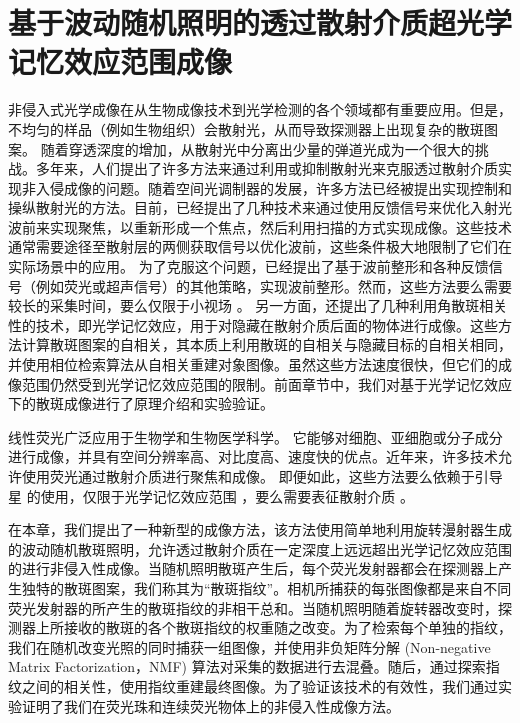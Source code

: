 
\chapter{基于波动随机照明的透过散射介质超光学记忆效应范围成像}

非侵入式光学成像在从生物成像技术\cite{zhao_non-invasive_2001,artzi_vivo_2011}到光学检测\cite{kozloff_non-invasive_2009}的各个领域都有重要应用。但是，不均匀的样品（例如生物组织）会散射光，从而导致探测器上出现复杂的散斑图案\cite{Goodman1976,Bender}。
随着穿透深度的增加，从散射光中分离出少量的弹道光成为一个很大的挑战\cite{Abramson1978,huang_optical_1991}。多年来，人们提出了许多方法来通过利用或抑制散射光来克服透过散射介质实现非入侵成像的问题。随着空间光调制器的发展，许多方法已经被提出实现控制和操纵散射光的方法\cite{Mosk2012,rotter_light_2017}。目前，已经提出了几种技术来通过使用反馈信号来优化入射光波前来实现聚焦，以重新形成一个焦点，然后利用扫描的方式实现成像\cite{Vellekoop2007,Horstmeyer2015}。这些技术通常需要途径至散射层的两侧获取信号以优化波前，这些条件极大地限制了它们在实际场景中的应用。
为了克服这个问题，已经提出了基于波前整形和各种反馈信号（例如荧光或超声信号）的其他策略\cite{Horstmeyer2015,Katz2019,Popoff2010,Hofer2019}，实现波前整形。然而，这些方法要么需要较长的采集时间，要么仅限于小视场 。
另一方面，还提出了几种利用角散斑相关性的技术\cite{bertolotti_non-invasive_2012,katz_non-invasive_2014}，即光学记忆效应\cite{Freund1988,Yllmaz2019,Osnabrugge}，用于对隐藏在散射介质后面的物体进行成像。这些方法计算散斑图案的自相关，其本质上利用散斑的自相关与隐藏目标的自相关相同，并使用相位检索算法从自相关重建对象图像。虽然这些方法速度很快，但它们的成像范围仍然受到光学记忆效应范围的限制。前面章节中，我们对基于光学记忆效应下的散斑成像进行了原理介绍和实验验证。

线性荧光广泛应用于生物学和生物医学科学\cite{Ruan2020,Lichtman2005,mangeat_super_resolved_2021}。 它能够对细胞、亚细胞或分子成分进行成像，并具有空间分辨率高、对比度高、速度快的优点。近年来，许多技术允许使用荧光通过散射介质进行聚焦和成像。
即便如此，这些方法要么依赖于引导星 \cite{Hhorstmeyer} 的使用，仅限于光学记忆效应范围 \cite{hofer_wide_2018}，要么需要表征散射介质 \cite{boniface_non_invasive_2020}。

在本章，我们提出了一种新型的成像方法，该方法使用简单地利用旋转漫射器生成的波动随机散斑照明，允许透过散射介质在一定深度上远远超出光学记忆效应范围的进行非侵入性成像。当随机照明散斑产生后，每个荧光发射器都会在探测器上产生独特的散斑图案，我们称其为“散斑指纹”。相机所捕获的每张图像都是来自不同荧光发射器的所产生的散斑指纹的非相干总和。当随机照明随着旋转器改变时，探测器上所接收的散斑的各个散斑指纹的权重随之改变。为了检索每个单独的指纹，我们在随机改变光照的同时捕获一组图像，并使用非负矩阵分解 (Non-negative Matrix Factorization，NMF) 算法对采集的数据进行去混叠。随后，通过探索指纹之间的相关性，使用指纹重建最终图像。为了验证该技术的有效性，我们通过实验证明了我们在荧光珠和连续荧光物体上的非侵入性成像方法。

